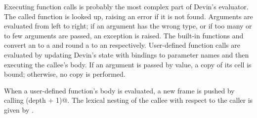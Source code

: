 \documentclass[UdineBachThesis,american,11pt]{PhdThesis}
\begin{document}
  Executing function calls is probably the most complex part of Devin's
  evaluator. The called function is looked up, raising an error if it is not
  found. Arguments are evaluated from left to right; if an argument has the
  wrong type, or if too many or to few arguments are passed, an exception is
  raised. The built-in functions \lstinline@toFloat@ and \lstinline@toInt@
  convert an \lstinline@Int@ to a \lstinline@Float@ and round a
  \lstinline@Float@ to an \lstinline@Int@ respectively. User-defined function
  calls are evaluated by updating Devin's state with bindings to parameter names
  and then executing the callee's body. If an argument is passed by value, a
  copy of its cell is bound; otherwise, no copy is performed.

  When a user-defined function's body is evaluated, a new frame is pushed by
  calling \lstinline@withNewFrame (depth + 1)@. The lexical nesting of the
  callee with respect to the caller is given by \lstinline@depth@.
\end{document}
